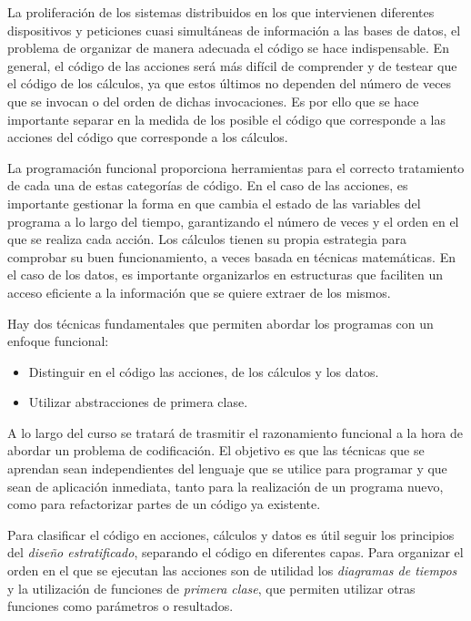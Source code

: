 \documentclass[a4paper,11pt]{extarticle}
\begin{document}
La proliferación de los sistemas distribuidos en los que intervienen diferentes dispositivos y peticiones cuasi simultáneas de información a las bases de datos, el problema de organizar de manera adecuada el código se hace indispensable. En general, el código de las acciones será más difícil de comprender y de testear que el código de los cálculos, ya que estos últimos no dependen del número de veces que se invocan o del orden de dichas invocaciones. Es por ello que se hace importante separar en la medida de los posible el código que corresponde a las acciones del código que corresponde a los cálculos.

La programación funcional proporciona herramientas para el correcto tratamiento de cada una de estas categorías de código. En el caso de las acciones, es importante gestionar la forma en que cambia el estado de las variables del programa a lo largo del tiempo, garantizando el número de veces y el orden en el que se realiza cada acción. Los cálculos tienen su propia estrategia para comprobar su buen funcionamiento, a veces basada en técnicas matemáticas. En el caso de los datos, es importante organizarlos en estructuras que faciliten un acceso eficiente a la información que se quiere extraer de los mismos.
 
Hay dos técnicas fundamentales que permiten abordar los programas con un enfoque funcional: 
\begin{itemize}
	\item Distinguir en el código las acciones, de los cálculos y los datos.
	\item Utilizar abstracciones de primera clase.
\end{itemize}

A lo largo del curso se tratará de trasmitir el razonamiento funcional a la hora de abordar un problema de codificación. El objetivo es que las técnicas que se aprendan sean independientes del lenguaje que se utilice para programar y que sean de aplicación inmediata, tanto para la realización de un programa nuevo, como para refactorizar partes de un código ya existente.

Para clasificar el código en acciones, cálculos y datos es útil seguir los principios del \textit{diseño estratificado}, separando el código en diferentes capas. Para organizar el orden en el que se ejecutan las acciones son de utilidad los \textit{diagramas de tiempos} y la utilización de funciones de \textit{primera clase}, que permiten utilizar otras funciones como parámetros o resultados.
\end{document}
